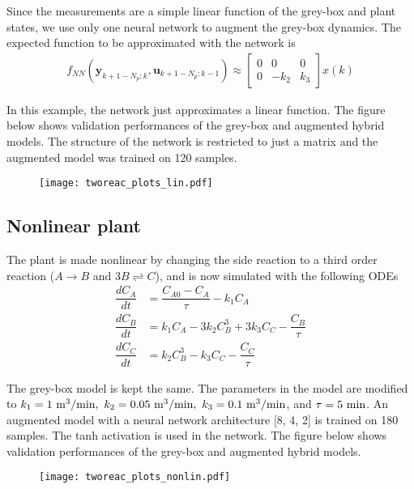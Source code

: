 \documentclass{article}
\begin{document}
Since the measurements are a simple linear function 
of the grey-box and plant states, we use only one 
neural network to 
augment the grey-box dynamics. 
The expected function 
to be approximated with the network is
\begin{align*}
  f_{NN}(\mathbf{y}_{k+1-N_p:k}, \mathbf{u}_{k+1-N_p:k-1}) \approx 
  \begin{bmatrix}
  0 & 0 & 0 \\  
  0 & -k_2 & k_3 
  \end{bmatrix}x(k)
\end{align*}

In this example, the network just approximates a linear function.
The figure below shows validation performances of the grey-box 
and augmented hybrid models. The structure 
of the network is restricted to just a matrix and
the augmented model was trained on 120 samples.

\begin{figure}[!h]
  \centering
  \texttt{[image: tworeac\_plots\_lin.pdf]}
\end{figure}

\subsection{Nonlinear plant}
The plant is made nonlinear by changing the side reaction 
to a third order reaction ($A \rightarrow B $ and  $3B \rightleftharpoons C$),
and is now simulated with the following ODEs
\begin{align*}
  \dfrac{dC_A}{dt} &= \dfrac{C_{A0} - C_A}{\tau} - k_1C_A\\
  \dfrac{dC_B}{dt} &= k_1C_A - 3k_2C^3_B + 3k_3C_C- \dfrac{C_B}{\tau}\\
  \dfrac{dC_C}{dt} &= k_2C^3_B - k_3C_C - \dfrac{C_C}{\tau}
\end{align*}

The grey-box model is kept the same. The parameters 
in the model are modified to 
$k_1 = 1 \ \textnormal{m}^3/\textnormal{min}, 
\ k_2 = 0.05 \ \textnormal{m}^3/\textnormal{min},
\ k_3 = 0.1 \ \textnormal{m}^3/\textnormal{min}$, 
and $\tau = 5 \ \textnormal{min}$.
An augmented model with a neural
network architecture [8, 4, 2] is trained on 180 samples. The 
tanh activation is used in the network. The figure below shows 
validation performances of the grey-box and augmented 
hybrid models.

\begin{figure}[!h]
  \centering
  \texttt{[image: tworeac\_plots\_nonlin.pdf]}
\end{figure}
\end{document}
